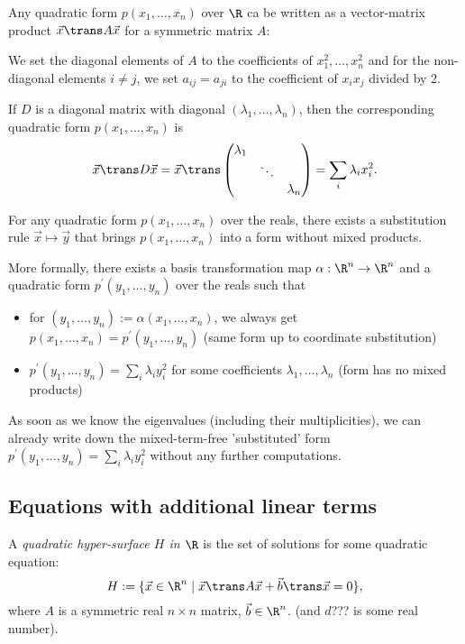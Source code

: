 \begin{remark}
    Any quadratic form $p(x_1,\dots,x_n)$ over $\R$ ca  be written as a vector-matrix product $\vec{x}\trans A \vec{x}$ for a symmetric matrix $A$:

    We set the diagonal elements of $A$ to the coefficients of $x_1^2,\dots,x_n^2$ and for the non-diagonal elements
    $i \ne j$, we set $a_{ij}=a_{ji}$ to the coefficient of $x_ix_j$ divided by 2.
\end{remark}

\begin{remark}
    If $D$ is a diagonal matrix with diagonal $(\lambda_1,\dots,\lambda_n)$, then the corresponding quadratic
    form $p(x_1,\dots,x_n)$ is
    $$\vec{x}\trans D \vec{x} = \vec{x}\trans \begin{pmatrix}\lambda_1 \\ & \ddots \\ & & \lambda_n \end{pmatrix} = \sum_i\lambda_ix_i^2.$$
\end{remark}

\begin{theorem}
    For any quadratic form $p(x_1,\dots,x_n)$ over the reals, there exists a substitution rule $\vec{x} \mapsto \vec{y}$ that
    brings $p(x_1,\dots,x_n)$ into a form without mixed products.

    More formally, there exists a basis transformation map $\alpha: \R^n \to \R^n$ and a quadratic form $p^\prime(y_1,\dots,y_n)$
    over the reals such that
    \begin{itemize}
        \item for $(y_1, \dots, y_n):= \alpha(x_1,\dots,x_n)$, we always get $p(x_1,\dots,x_n) = p^\prime(y_1,\dots,y_n)$ (same
            form up to coordinate substitution)
        \item $p^\prime(y_1,\dots,y_n)=\sum_i\lambda_iy_i^2$ for some coefficients $\lambda_1, \dots, \lambda_n$ (form has no mixed products)
    \end{itemize}
\end{theorem}

\begin{remark}
    As soon as we know the eigenvalues (including their multiplicities), we can already write down the mixed-term-free 'substituted' 
    form $p^\prime(y_1,\dots,y_n)=\sum_i\lambda_iy_i^2$ without any further computations.
\end{remark}

\subsection*{Equations with additional linear terms}
\begin{definition}
    A \emph{quadratic hyper-surface $H$ in $\R$} is the set of solutions for some quadratic equation:
    $$H := \{\vec{x} \in \R^n \mid \vec{x}\trans A \vec{x} + \vec{b}\trans\vec{x}=0\},$$
    where $A$ is a symmetric real $n \times n$ matrix, $\vec{b} \in \R^n$. (and $d$??? is some real number).
\end{definition}

